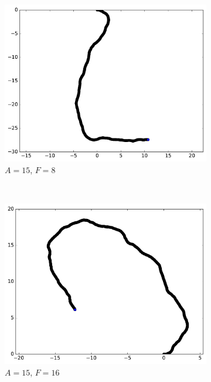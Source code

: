 \begin{figure}[htb]
		~
		\begin{subfigure}[t]{\subImgWmo}
			\centering
			\includegraphics[width=\textwidth]{figures/ch3/synTraj_219_15_8}
			\caption[$A = 15$, $F=8$]{$A = 15$, $F=8$}
			\label{fig:synTraj_219_15_8}
		\end{subfigure}
		~
		\begin{subfigure}[t]{\subImgWmo}
			\centering
			\includegraphics[width=\textwidth]{figures/ch3/synTraj_219_15_16}
			\caption[$A = 15$, $F=16$]{$A = 15$, $F=16$}
			\label{fig:synTraj_219_15_16}
		\end{subfigure}
		~
		\begin{subfigure}[t]{\subImgWmo}

\end{subfigure}
\end{figure}

